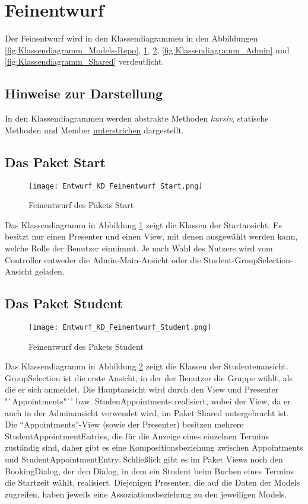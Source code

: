 \section{Feinentwurf}
Der Feinentwurf wird in den Klassendiagrammen in den Abbildungen \ref{fig:Klassendiagramm_Models-Repo}, \ref{fig:Klassendiagramm_Start}, \ref{fig:Klassendiagramm_Student}, \ref{fig:Klassendiagramm_Admin} und \ref{fig:Klassendiagramm_Shared} verdeutlicht.

\subsection{Hinweise zur Darstellung}
In den Klassendiagrammen werden abstrakte Methoden \textit{kursiv}, statische Methoden und Member \underline{unterstrichen} dargestellt.

 \subsection{Das Paket Start}
 \begin{figure}
  \texttt{[image: Entwurf\_KD\_Feinentwurf\_Start.png]}
  \label{fig:Klassendiagramm_Start}
  \caption{Feinentwurf des Pakets Start}
 \end{figure}

 Das Klassendiagramm in Abbildung \ref{fig:Klassendiagramm_Start} zeigt die Klassen der Startansicht. Es besitzt nur einen Presenter und einen View, mit denen ausgewählt werden kann, welche Rolle der Benutzer einnimmt. Je nach Wahl des Nutzers wird vom Controller entweder die Admin-Main-Ansicht oder die Student-GroupSelection-Ansicht geladen.

 \subsection{Das Paket Student}
 \begin{figure}
    \texttt{[image: Entwurf\_KD\_Feinentwurf\_Student.png]}
    \label{fig:Klassendiagramm_Student}
    \caption{Feinentwurf des Pakets Student}
 \end{figure}

Das Klassendiagramm in Abbildung \ref{fig:Klassendiagramm_Student} zeigt die Klassen der Studentenansicht.
GroupSelection ist die erste Ansicht, in der der Benutzer die Gruppe wählt, als die er sich anmeldet.
Die Hauptansicht wird durch den View und Presenter "`Appointments"`' bzw. StudenAppointments realisiert, wobei der View, da er auch in der Adminansicht verwendet wird, im Paket Shared untergebracht ist.
Die "`Appointments"'-View (sowie der Presenter) besitzen mehrere StudentAppointmentEntries, die für die Anzeige eines einzelnen Termins zuständig sind, daher gibt es eine Kompositionsbeziehung zwischen Appointments und StudentAppointmentEntry.
Schließlich gibt es im Paket Views noch den BookingDialog, der den Dialog, in dem ein Student beim Buchen eines Termins die Startzeit wählt, realisiert.
Diejenigen Presenter, die auf die Daten der Models zugreifen, haben jeweils eine Assoziationsbeziehung zu den jeweiligen Models.

